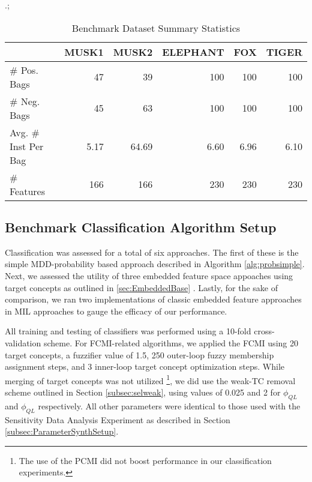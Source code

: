 \documentclass[12pt,dvips]{report}
\numberwithin{equation}{section}
\begin{document}
\begin {table}[H]
\caption{Benchmark Dataset Summary Statistics} \label{tab:DataBenchmark} .;
\begin{center}
\begin{tabular}{lrrrrr}
\hline


& MUSK1& MUSK2 & ELEPHANT & FOX & TIGER \\
\hline
\# Pos. Bags     & 47 & 39 & 100 & 100 & 100 \\
\# Neg. Bags    & 45 & 63 & 100 & 100 & 100 \\
Avg. \# Inst Per Bag  & 5.17 & 64.69 & 6.60 & 6.96 & 6.10 \\
\# Features & 166 & 166 & 230 & 230 & 230 
\end{tabular}
\end{center}
\end{table}

\subsection{Benchmark Classification Algorithm Setup} \label{subsec:Benchmark Setup}

Classification was assessed for a total of six approaches.  The first of these is the simple MDD-probability based approach described in Algorithm \ref{alg:probsimple}.  Next, we assessed the utility of three embedded feature space appoaches using target concepts as outlined in \ref{sec:EmbeddedBase} .  Lastly, for the sake of comparison, we ran two implementations of classic embedded feature approaches in MIL approaches to gauge the efficacy of our performance. 

All training and testing of classifiers was performed using a 10-fold cross-validation scheme.  For FCMI-related algorithms, we applied the FCMI using 20 target concepts, a fuzzifier value of 1.5, 250 outer-loop fuzzy membership assignment steps, and 3 inner-loop target concept optimization steps.  While merging of target concepts was not utilized \footnote{The use of the PCMI did not boost performance in our classification experiments.}, we did use the weak-TC removal scheme outlined in Section \ref{subsec:selweak}, using values of 0.025 and 2 for $\phi_{QL}$ and $\phi_{QL}$ respectively.  All other parameters were identical to those used with the Sensitivity Data Analysis Experiment as described in Section  \ref{subsec:ParameterSynthSetup}.
\end{document}
